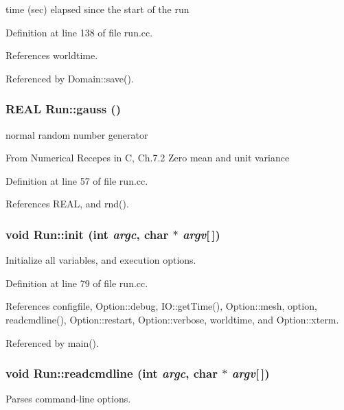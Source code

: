 time (sec) elapsed since the start of the run 



Definition at line 138 of file run.cc.

References worldtime.

Referenced by Domain::save().\hypertarget{namespaceRun_d4c4416d555619b82bbaad195bbb1dcc}{
\subsubsection[{gauss}]{\setlength{\rightskip}{0pt plus 5cm}REAL Run::gauss ()}}
\label{namespaceRun_d4c4416d555619b82bbaad195bbb1dcc}


normal random number generator 

From Numerical Recepes in C, Ch.7.2 Zero mean and unit variance 

Definition at line 57 of file run.cc.

References REAL, and rnd().\hypertarget{namespaceRun_719eff34d155bf728b3c621f7c6b1c92}{
\subsubsection[{init}]{\setlength{\rightskip}{0pt plus 5cm}void Run::init (int {\em argc}, \/  char $\ast$ {\em argv}\mbox{[}$\,$\mbox{]})}}
\label{namespaceRun_719eff34d155bf728b3c621f7c6b1c92}


Initialize all variables, and execution options. 



Definition at line 79 of file run.cc.

References configfile, Option::debug, IO::getTime(), Option::mesh, option, readcmdline(), Option::restart, Option::verbose, worldtime, and Option::xterm.

Referenced by main().\hypertarget{namespaceRun_bce2c6229363ea0c1a164b61fcd06f89}{
\subsubsection[{readcmdline}]{\setlength{\rightskip}{0pt plus 5cm}void Run::readcmdline (int {\em argc}, \/  char $\ast$ {\em argv}\mbox{[}$\,$\mbox{]})}}
\label{namespaceRun_bce2c6229363ea0c1a164b61fcd06f89}


Parses command-line options. 



